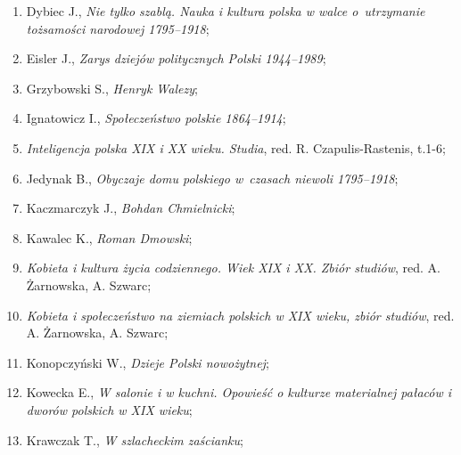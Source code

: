 \documentclass[a4paper,11pt]{article}
\begin{document}
\begin{enumerate}
\item Dybiec J., \textit{Nie tylko szablą. Nauka i kultura polska w
    walce o~utrzymanie tożsamości narodowej 1795--1918};



\item Eisler J., \textit{Zarys dziejów politycznych Polski 1944--1989};



\item Grzybowski S., \textit{Henryk Walezy};



\item Ignatowicz I., \textit{Społeczeństwo polskie 1864--1914};



\item \textit{Inteligencja polska XIX i XX wieku. Studia}, red. R.
  Czapulis-Rastenis, t.1-6;



\item Jedynak B., \textit{Obyczaje domu polskiego w~czasach niewoli
    1795--1918};



\item Kaczmarczyk J., \textit{Bohdan Chmielnicki};



\item Kawalec K., \textit{Roman Dmowski};



\item \textit{Kobieta i kultura życia codziennego. Wiek XIX i XX. Zbiór
    studiów}, red. A. Żarnowska, A. Szwarc;



\item \textit{Kobieta i społeczeństwo na ziemiach polskich w XIX wieku,
    zbiór studiów}, red. A. Żarnowska, A. Szwarc;



\item Konopczyński W., \textit{Dzieje Polski nowożytnej};



\item Kowecka E., \textit{W salonie i w kuchni. Opowieść o kulturze
    materialnej pałaców i dworów polskich w XIX wieku};



\item Krawczak T., \textit{W szlacheckim zaścianku};




\end{enumerate}
\end{document}
